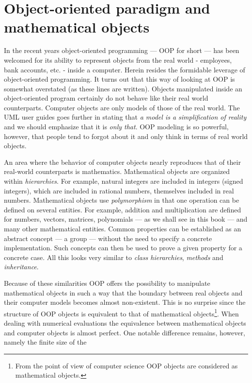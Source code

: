 \documentclass[twoside]{book}
\begin{document}
\section{Object-oriented paradigm and mathematical objects}
In the recent years object-oriented programming --- OOP for short
--- has been welcomed for its ability to represent objects from the
real world - employees, bank accounts, etc. - inside a computer.
Herein resides the formidable leverage of object-oriented
programming. It turns out that this way of looking at OOP is
somewhat overstated (as these lines are written). Objects
manipulated inside an object-oriented program certainly do not
behave like their real world counterparts. Computer objects are
only models of those of the real world. The UML user guides goes
further in stating that {\it a model is a simplification of
reality} and we should emphasize that it is {\sl only that}. OOP
modeling is so powerful, however, that people tend to forgot about
it and only think in terms of real world objects.
\par
An area where the behavior of computer objects nearly reproduces
that of their real-world counterparts is mathematics. Mathematical
objects are organized within {\it hierarchies}. For example,
natural integers are included in integers (signed integers), which
are included in rational numbers, themselves included in real
numbers. Mathematical objects use {\it polymorphism} in that one
operation can be defined on several entities. For example,
addition and multiplication are defined for numbers, vectors,
matrices, polynomials --- as we shall see in this book --- and
many other mathematical entities. Common properties can be
established as an abstract concept --- a group \eg --- without the
need to specify a concrete implementation. Such concepts can then
be used to prove a given property for a concrete case. All this
looks very similar to {\sl class hierarchies}, {\sl methods} and
{\sl inheritance}.
\par
Because of these similarities OOP offers the possibility to
manipulate mathematical objects in such a way that the boundary
between real objects and their computer models becomes almost
non-existent. This is no surprise since the structure of OOP
objects is equivalent  to that of mathematical
objects\footnote{From the point of view of computer science OOP
objects are considered as mathematical objects.}. When dealing
with numerical evaluations the equivalence between mathematical
objects and computer objects is almost perfect. One notable
difference remains, however, namely the finite size of the
\end{document}
